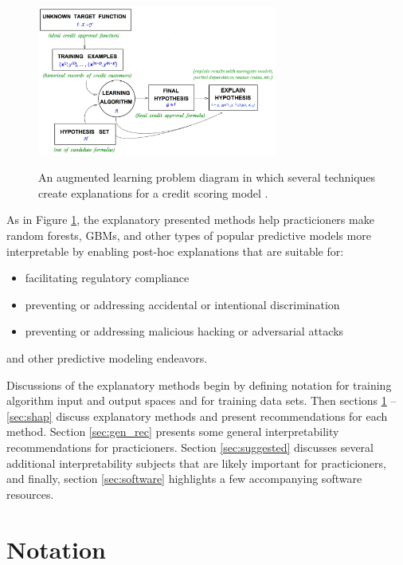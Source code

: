 \documentclass{article}
\begin{document}
\begin{figure}[htb]
	\begin{center}
		\includegraphics[height=140pt]{img/learning_problem.png}
		\label{fig:learning_problem}
		\caption{An augmented learning problem diagram in which several techniques create explanations for a credit scoring model \cite{lfd}.}
	\end{center}
\end{figure}	
	
As in Figure \ref{fig:learning_problem}, the explanatory presented methods help practicioners make random forests, GBMs, and other types of popular predictive models more interpretable by enabling post-hoc explanations that are suitable for:

\begin{itemize}
	\item facilitating regulatory compliance
	\item preventing or addressing accidental or intentional discrimination
	\item preventing or addressing malicious hacking or adversarial attacks
\end{itemize}

and other predictive modeling endeavors. 

Discussions of the explanatory methods begin by defining notation for training algorithm input and output spaces and for training data sets. Then sections \ref{sec:notation} -- \ref{sec:shap} discuss explanatory methods and present recommendations for each method. Section \ref{sec:gen_rec} presents some general interpretability recommendations for practicioners. Section \ref{sec:suggested} discusses several additional interpretability subjects that are likely important for practicioners, and finally, section \ref{sec:software} highlights a few accompanying software resources. 

\section{Notation} \label{sec:notation}
\end{document}
